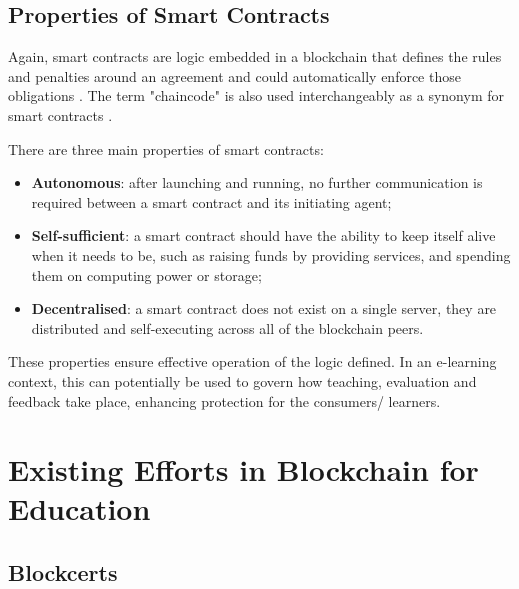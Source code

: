 \subsection{Properties of Smart Contracts}
Again, smart contracts are logic embedded in a blockchain that defines the rules and penalties around an agreement and 
could automatically enforce those obligations \citep{gulhane2017ibm}. The term "chaincode" is also used interchangeably 
as a synonym for smart contracts \citep[p.6]{valenta2017comparison}.

There are three main properties of smart contracts:

\begin{itemize}
    \setlength\itemsep{0.2em}        
    \item \textbf{Autonomous}: after launching and running, no further communication is required between a smart contract 
    and its initiating agent;
    \item \textbf{Self-sufficient}: a smart contract should have the ability to keep itself alive when it needs to be, 
    such as raising funds by providing services, and spending them on computing power or storage;
    \item \textbf{Decentralised}: a smart contract does not exist on a single server, they are distributed and self-executing 
    across all of the blockchain peers.\\ 
    \citet[p.16]{swan2015blockchain} 
\end{itemize}

These properties ensure effective operation of the logic defined. In an e-learning context, this can potentially 
be used to govern how teaching, evaluation and feedback take place, enhancing protection for the consumers/ learners.

\section{Existing Efforts in Blockchain for Education}


\subsection{Blockcerts}

